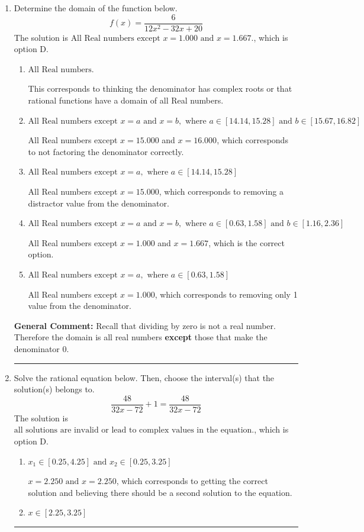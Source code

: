 \documentclass{extbook}[14pt]
\newcommand{\litem}[1]{\item #1

\rule{\textwidth}{0.4pt}}
\begin{document}
\begin{enumerate}\litem{
Determine the domain of the function below.
\[ f(x) = \frac{6}{12x^{2} -32 x + 20} \]The solution is \( \text{All Real numbers except } x = 1.000 \text{ and } x = 1.667. \), which is option D.\begin{enumerate}[label=\Alph*.]
\item \( \text{All Real numbers.} \)

This corresponds to thinking the denominator has complex roots or that rational functions have a domain of all Real numbers.
\item \( \text{All Real numbers except } x = a \text{ and } x = b, \text{ where } a \in [14.14, 15.28] \text{ and } b \in [15.67, 16.82] \)

All Real numbers except $x = 15.000$ and $x = 16.000$, which corresponds to not factoring the denominator correctly.
\item \( \text{All Real numbers except } x = a, \text{ where } a \in [14.14, 15.28] \)

All Real numbers except $x = 15.000$, which corresponds to removing a distractor value from the denominator.
\item \( \text{All Real numbers except } x = a \text{ and } x = b, \text{ where } a \in [0.63, 1.58] \text{ and } b \in [1.16, 2.36] \)

All Real numbers except $x = 1.000$ and $x = 1.667$, which is the correct option.
\item \( \text{All Real numbers except } x = a, \text{ where } a \in [0.63, 1.58] \)

All Real numbers except $x = 1.000$, which corresponds to removing only 1 value from the denominator.
\end{enumerate}

\textbf{General Comment:} Recall that dividing by zero is not a real number. Therefore the domain is all real numbers \textbf{except} those that make the denominator 0.
}
\litem{
Solve the rational equation below. Then, choose the interval(s) that the solution(s) belongs to.
\[ \frac{48}{32x -72} + 1 = \frac{48}{32x -72} \]The solution is \( \text{all solutions are invalid or lead to complex values in the equation.} \), which is option D.\begin{enumerate}[label=\Alph*.]
\item \( x_1 \in [0.25, 4.25] \text{ and } x_2 \in [0.25,3.25] \)

$x = 2.250 \text{ and } x = 2.250$, which corresponds to getting the correct solution and believing there should be a second solution to the equation.
\item \( x \in [2.25,3.25] \)


\end{enumerate}}
\end{enumerate}
\end{document}
